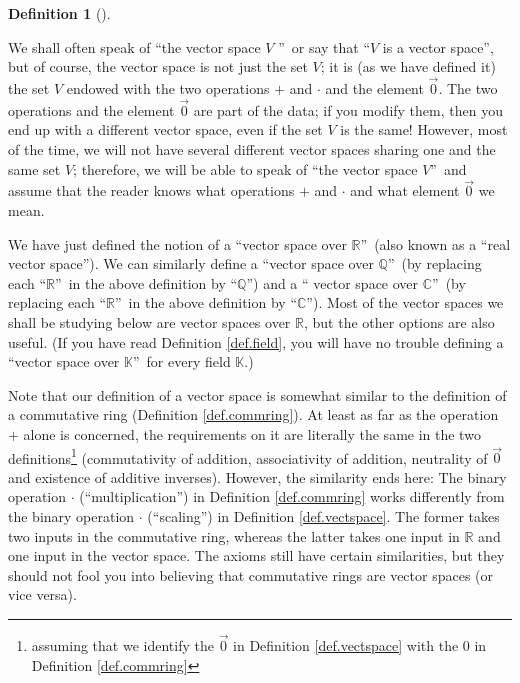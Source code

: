 \documentclass[numbers=enddot,12pt,final,onecolumn,notitlepage]{scrartcl}%
\theoremstyle{definition}
\newtheorem{defi}[theo]{Definition}
\newenvironment{definition}[1][]
{\begin{defi}[#1]\begin{leftbar}}
{\end{leftbar}\end{defi}}
\begin{document}
\begin{definition}
We shall often speak of \textquotedblleft the vector space $V$%
\textquotedblright\ or say that \textquotedblleft$V$ is a vector
space\textquotedblright, but of course, the vector space is not just the set
$V$; it is (as we have defined it) the set $V$ endowed with the two operations
$+$ and $\cdot$ and the element $\overrightarrow{0}$. The two operations and
the element $\overrightarrow{0}$ are part of the data; if you modify them,
then you end up with a different vector space, even if the set $V$ is the
same! However, most of the time, we will not have several different vector
spaces sharing one and the same set $V$; therefore, we will be able to speak
of \textquotedblleft the vector space $V$\textquotedblright\ and assume that
the reader knows what operations $+$ and $\cdot$ and what element
$\overrightarrow{0}$ we mean.
\end{definition}

We have just defined the notion of a \textquotedblleft vector space over
$\mathbb{R}$\textquotedblright\ (also known as a \textquotedblleft real vector
space\textquotedblright). We can similarly define a \textquotedblleft vector
space over $\mathbb{Q}$\textquotedblright\ (by replacing each
\textquotedblleft$\mathbb{R}$\textquotedblright\ in the above definition by
\textquotedblleft$\mathbb{Q}$\textquotedblright) and a \textquotedblleft
vector space over $\mathbb{C}$\textquotedblright\ (by replacing each
\textquotedblleft$\mathbb{R}$\textquotedblright\ in the above definition by
\textquotedblleft$\mathbb{C}$\textquotedblright). Most of the vector spaces we
shall be studying below are vector spaces over $\mathbb{R}$, but the other
options are also useful. (If you have read Definition \ref{def.field}, you
will have no trouble defining a \textquotedblleft vector space over
$\mathbb{K}$\textquotedblright\ for every field $\mathbb{K}$.)

Note that our definition of a vector space is somewhat similar to the
definition of a commutative ring (Definition \ref{def.commring}). At least as
far as the operation $+$ alone is concerned, the requirements on it are
literally the same in the two definitions\footnote{assuming that we identify
the $\overrightarrow{0}$ in Definition \ref{def.vectspace} with the $0$ in
Definition \ref{def.commring}} (commutativity of addition, associativity of
addition, neutrality of $\overrightarrow{0}$ and existence of additive
inverses). However, the similarity ends here: The binary operation $\cdot$
(\textquotedblleft multiplication\textquotedblright) in Definition
\ref{def.commring} works differently from the binary operation $\cdot$
(\textquotedblleft scaling\textquotedblright) in Definition
\ref{def.vectspace}. The former takes two inputs in the commutative ring,
whereas the latter takes one input in $\mathbb{R}$ and one input in the vector
space. The axioms still have certain similarities, but they should not fool
you into believing that commutative rings are vector spaces (or vice versa).
\end{document}
